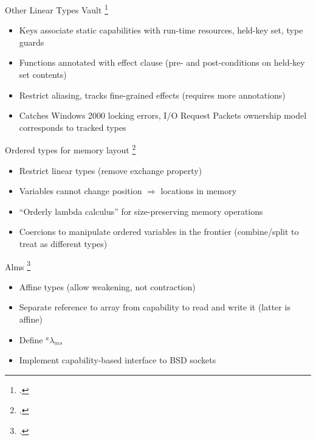 \documentclass[aspectratio=169]{beamer}
\begin{document}
\begin{frame}{Other Linear Types}
  Vault \footcite{deline_enforcing_2001} %
    \begin{itemize}
        \item Keys associate static capabilities with run-time resources, held-key set, type guards
        \item Functions annotated with effect clause (pre- and post-conditions on held-key set contents)
        \item Restrict aliasing, tracks fine-grained effects (requires more annotations)
        \item Catches Windows 2000 locking errors, I/O Request Packets ownership model corresponds to tracked types
    \end{itemize}
  Ordered types for memory layout \footcite{petersen_type_2003}
    \begin{itemize}
        \item Restrict linear types (remove exchange property)
        \item Variables cannot change position $\Rightarrow$ locations in memory
        \item ``Orderly lambda calculus'' for size-preserving memory operations
        \item Coercions to manipulate ordered variables in the frontier (combine/split to treat as different types)
    \end{itemize}
  Alms \footcite{tov_practical_2011}
    \begin{itemize}
        \item Affine types (allow weakening, not contraction) %
        \item Separate reference to array from capability to read and write it (latter is affine)
        \item Define $^{a}\lambda_{ms}$
        \item Implement capability-based interface to BSD sockets %
    \end{itemize}
\end{frame}
\end{document}
